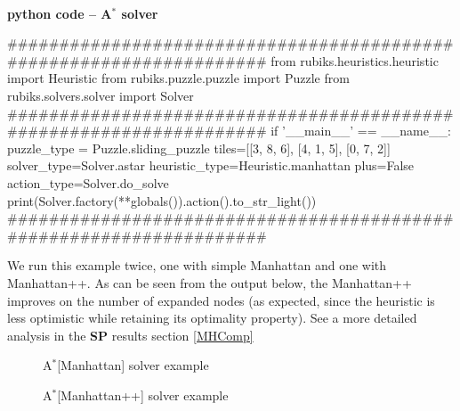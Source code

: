 


\afblue
\paragraph{}{\textbf{python code -- A$^{*}$ solver}}
\begin{python}
####################################################################
from rubiks.heuristics.heuristic import Heuristic
from rubiks.puzzle.puzzle import Puzzle
from rubiks.solvers.solver import Solver
####################################################################
if '__main__' == __name__:
    puzzle_type = Puzzle.sliding_puzzle
    tiles=[[3, 8, 6], [4, 1, 5], [0, 7, 2]]
    solver_type=Solver.astar
    heuristic_type=Heuristic.manhattan
    plus=False
    action_type=Solver.do_solve
    print(Solver.factory(**globals()).action().to_str_light())
####################################################################
\end{python}
\black
We run this example twice, one with simple Manhattan and one with Manhattan++. As can be seen from the output below, the Manhattan++ improves on the number of expanded nodes (as expected, since the heuristic is less optimistic while retaining its optimality property). See a more detailed analysis in the \textbf{SP} results section \ref{MHComp}



\begin{figure}[H]
  \noindent
  \caption[Examples]{A$^{*}$[Manhattan] solver example}
  \label{fig:exampleastarmanhattansolver}
\end{figure}



\begin{figure}[H]
  \noindent
  \caption[Examples]{A$^{*}$[Manhattan++] solver example}
  \label{fig:exampleastarmanhattanplussolver}
\end{figure}



